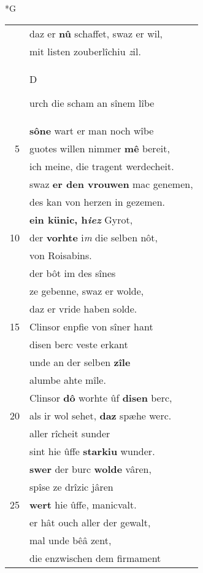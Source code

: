 \documentclass[8pt,a4paper,notitlepage]{article}
\begin{document}
\begin{table}[ht]
\begin{minipage}[t]{0.5\linewidth}
\small
\begin{center}*G
\end{center}
\begin{tabular}{rl}
 & daz er \textbf{nû} schaffet, swaz er wil,\\ 
 & mit listen zouberlîchiu \textit{z}il.\\ 
 & \begin{large}D\end{large}urch die scham an sînem lîbe\\ 
 & \textbf{sô}\textbf{ne} wart er man noch wîbe\\ 
5 & guotes willen nimmer \textbf{mê} bereit,\\ 
 & ich meine, die tragent werdecheit.\\ 
 & swaz \textbf{er den vrouwen} mac genemen,\\ 
 & des kan von herzen in gezemen.\\ 
 & \textbf{ein künic, h\textit{iez}} Gyrot,\\ 
10 & der \textbf{vorhte} i\textit{m} die selben nôt,\\ 
 & von Roisabins.\\ 
 & der bôt im des sînes\\ 
 & ze gebenne, swaz er wolde,\\ 
 & daz er vride haben solde.\\ 
15 & Clinsor enpfie von sîner hant\\ 
 & disen berc veste erkant\\ 
 & unde an der selben \textbf{zîle}\\ 
 & alumbe ahte mîle.\\ 
 & Clinsor \textbf{dô} worhte ûf \textbf{disen} berc,\\ 
20 & als ir wol sehet, \textbf{daz} spæhe werc.\\ 
 & aller rîcheit sunder\\ 
 & sint hie ûffe \textbf{starkiu} wunder.\\ 
 & \textbf{swer} der burc \textbf{wolde} vâren,\\ 
 & spîse ze drîzic jâren\\ 
25 & \textbf{wert} hie ûffe, manicvalt.\\ 
 & er hât ouch aller der gewalt,\\ 
 & mal unde bêâ zent,\\ 
 & die enzwischen dem firmament\\ 

\end{tabular}
\end{minipage}
\end{table}
\end{document}
